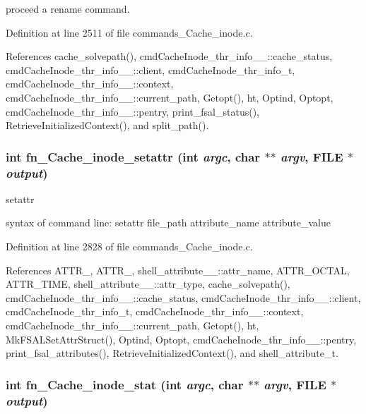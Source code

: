 proceed a rename command. 

Definition at line 2511 of file commands\_\-Cache\_\-inode.c.

References cache\_\-solvepath(), cmd\-Cache\-Inode\_\-thr\_\-info\_\-\_\-::cache\_\-status, cmd\-Cache\-Inode\_\-thr\_\-info\_\-\_\-::client, cmd\-Cache\-Inode\_\-thr\_\-info\_\-t, cmd\-Cache\-Inode\_\-thr\_\-info\_\-\_\-::context, cmd\-Cache\-Inode\_\-thr\_\-info\_\-\_\-::current\_\-path, Getopt(), ht, Optind, Optopt, cmd\-Cache\-Inode\_\-thr\_\-info\_\-\_\-::pentry, print\_\-fsal\_\-status(), Retrieve\-Initialized\-Context(), and split\_\-path().
\subsubsection{\setlength{\rightskip}{0pt plus 5cm}int fn\_\-Cache\_\-inode\_\-setattr (int {\em argc}, char $\ast$$\ast$ {\em argv}, FILE $\ast$ {\em output})}\label{commands_8h_a47}


setattr

syntax of command line: setattr file\_\-path attribute\_\-name attribute\_\-value 

Definition at line 2828 of file commands\_\-Cache\_\-inode.c.

References ATTR\_, ATTR\_, shell\_\-attribute\_\-\_\-::attr\_\-name, ATTR\_\-OCTAL, ATTR\_\-TIME, shell\_\-attribute\_\-\_\-::attr\_\-type, cache\_\-solvepath(), cmd\-Cache\-Inode\_\-thr\_\-info\_\-\_\-::cache\_\-status, cmd\-Cache\-Inode\_\-thr\_\-info\_\-\_\-::client, cmd\-Cache\-Inode\_\-thr\_\-info\_\-t, cmd\-Cache\-Inode\_\-thr\_\-info\_\-\_\-::context, cmd\-Cache\-Inode\_\-thr\_\-info\_\-\_\-::current\_\-path, Getopt(), ht, Mk\-FSALSet\-Attr\-Struct(), Optind, Optopt, cmd\-Cache\-Inode\_\-thr\_\-info\_\-\_\-::pentry, print\_\-fsal\_\-attributes(), Retrieve\-Initialized\-Context(), and shell\_\-attribute\_\-t.
\subsubsection{\setlength{\rightskip}{0pt plus 5cm}int fn\_\-Cache\_\-inode\_\-stat (int {\em argc}, char $\ast$$\ast$ {\em argv}, FILE $\ast$ {\em output})}\label{commands_8h_a39}


